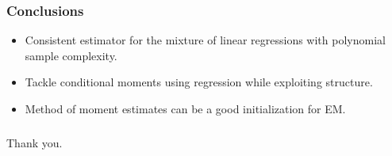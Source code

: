 \documentclass[xcolor={svgnames}]{beamer}
\begin{document}
\begin{frame}
  \frametitle{Conclusions}
  \begin{itemize}
    \item Consistent estimator for the mixture of linear regressions with polynomial sample complexity.
    \item Tackle conditional moments using regression while exploiting structure.
    \item Method of moment estimates can be a good initialization for EM.
  \end{itemize}
\end{frame}

\begin{frame}
  \frametitle{}
  Thank you.
\end{frame}
\end{document}
